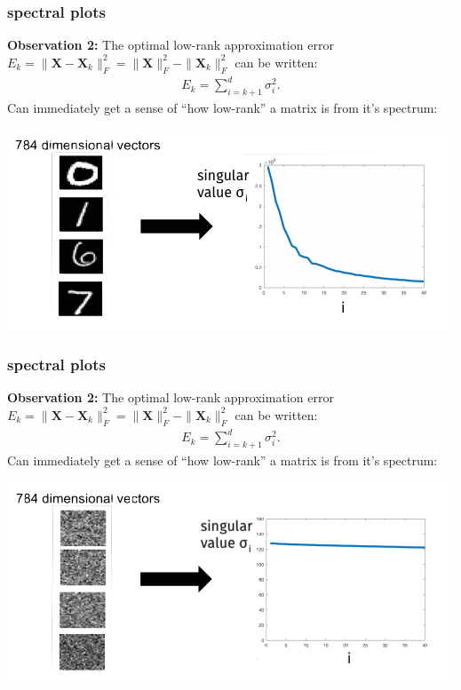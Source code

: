 \documentclass[compress]{beamer}
\newcommand{\bv}[1]{\mathbf{#1}}
\begin{document}
\begin{frame}[t]
	\frametitle{spectral plots}
	\textbf{Observation 2:}
	The optimal low-rank approximation error $E_k = \|\bv{X} - \bv{X}_k\|_F^2 = \|\bv{X}\|_F^2 - \|\bv{X}_k\|_F^2$ can be written:
	\begin{align*}
	E_k = \sum_{i=k+1}^d \sigma_i^2.
	\end{align*}
	Can immediately get a sense of ``how low-rank'' a matrix is from it's spectrum:
	\begin{center}
		\includegraphics[width=.8\textwidth]{mnist_spectrum.png}
	\end{center}
\end{frame}

\begin{frame}[t]
	\frametitle{spectral plots}
	\textbf{Observation 2:}
	The optimal low-rank approximation error $E_k = \|\bv{X} - \bv{X}_k\|_F^2 = \|\bv{X}\|_F^2 - \|\bv{X}_k\|_F^2$ can be written:
	\begin{align*}
	E_k = \sum_{i=k+1}^d \sigma_i^2.
	\end{align*}
	Can immediately get a sense of ``how low-rank'' a matrix is from it's spectrum:
	\begin{center}
		\includegraphics[width=.8\textwidth]{noise_spectrum.png}
	\end{center}
\end{frame}
\end{document}
